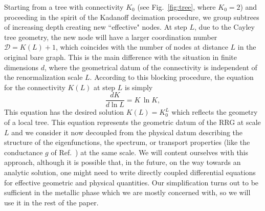\documentclass[reprint,aps,prl,superscriptaddress,english,nolongbibliography]{revtex4-1}
\begin{document}
Starting from a tree with connectivity $K_0$ (see Fig.~\ref{fig:tree}, where $K_0=2$) and proceeding in the spirit of the Kadanoff decimation procedure, we group subtrees of increasing depth creating new ``effective" nodes.
At step $L$, due to the Cayley tree geometry, the new node will have a larger coordination number $\mathcal{D} = K(L)+1$, which coincides with the number of nodes at distance $L$ in the original bare graph. This is the main difference with the situation in finite dimensions $d$, where the geometrical datum of the connectivity is independent of the renormalization scale $L$.
According to this blocking procedure, the equation for the connectivity $K(L)$ at step $L$ is simply  
\begin{equation}\label{Eq-K}
    \frac{d K}{d \ln L}=K \,\ln K,  
\end{equation}
This equation has the desired solution $K(L)=K_0^L$ which reflects the geometry of a local tree. This equation represents the geometric datum of the RRG at scale $L$ and we consider it now decoupled from the physical datum describing the structure of the eigenfunctions, the spectrum, or transport properties (like the conductance $g$ of Ref.~\cite{abrahams1979scaling}) at the same scale. We will content ourselves with this approach, although it is possible that, in the future, on the way towards an analytic solution, one might need to write directly coupled differential equations for effective geometric and physical quantities. Our simplification turns out to be sufficient in the metallic phase which we are mostly concerned with, so we will use it in the rest of the paper. 
\end{document}
